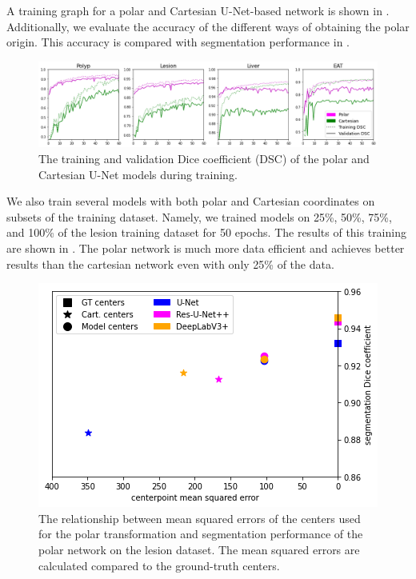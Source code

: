 
A training graph for a polar and Cartesian U-Net-based network is shown in . Additionally, we evaluate the accuracy of the different ways of obtaining the polar origin. This accuracy is compared with segmentation performance in .

	\begin{figure}[h]
		\centering
		\includegraphics[width=\linewidth]{images/4/training-graphs}
		\caption{The training and validation Dice coefficient (DSC) of the polar and Cartesian U-Net models during training. \cite{bencevicTrainingPolarImage2021}}
		\label{fig:training}
	\end{figure}
	
\clearpage
		
We also train several models with both polar and Cartesian coordinates on subsets of the training dataset. Namely, we trained models on 25\%, 50\%, 75\%, and 100\% of the lesion training dataset for 50 epochs. The results of this training are shown in . The polar network is much more data efficient and achieves better results than the cartesian network even with only 25\% of the data.

	\begin{figure}[h]
		\centering
		\includegraphics[width=0.65\linewidth]{images/4/mse-vs-dice}
		\caption{The relationship between mean squared errors of the centers used for the polar transformation and segmentation performance of the polar network on the lesion dataset. The mean squared errors are calculated compared to the ground-truth centers. \cite{bencevicTrainingPolarImage2021}}
		\label{fig:centers-vs-performance}
	\end{figure}

